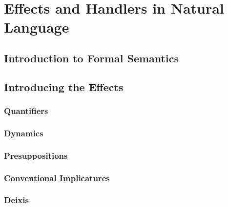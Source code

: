 \documentclass{report}
\begin{document}
\part{Effects and Handlers in Natural Language}

\chapter{Introduction to Formal Semantics}
\label{chap:intro-fs}

\chapter{Introducing the Effects}
\section{Quantifiers}
\section{Dynamics}
\section{Presuppositions}
\section{Conventional Implicatures}
\section{Deixis}





\end{document}
